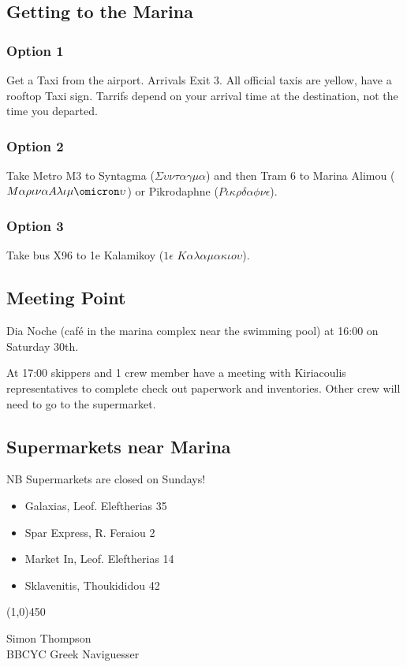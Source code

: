 \documentclass[12pt,a4paper,oneside]{article}
\begin{document}
\begin{multicols}{2}
\subsection*{Getting to the Marina}
\subsubsection*{Option 1}
Get a Taxi from the airport.  Arrivals Exit 3.  All official taxis are yellow, have a rooftop Taxi sign.  Tarrifs depend on your arrival time at the destination, not the time you departed.
\subsubsection*{Option 2}
Take Metro M3 to Syntagma ($\Sigma\upsilon\nu\tau\alpha\gamma\mu\alpha$) and then Tram 6 to Marina Alimou ($M\alpha\rho\iota\nu\alpha A\lambda\iota\mu\omicron\upsilon $) or Pikrodaphne ($P\iota\kappa\rho\delta\alpha\phi\nu\epsilon $).
\subsubsection*{Option 3}
Take bus X96 to 1e Kalamikoy ($1\epsilon$ $K\alpha\lambda\alpha\mu\alpha\kappa\iota o \upsilon$).

\subsection*{Meeting Point}

\noindent Dia Noche (café in the marina complex near the swimming pool) at 16:00 on Saturday 30th.

\noindent At 17:00 skippers and 1 crew member have a meeting with Kiriacoulis representatives to complete check out paperwork and inventories.  Other crew will need to go to the supermarket.

\subsection*{Supermarkets near Marina}
NB Supermarkets are closed on Sundays!
\begin{itemize}
\item Galaxias, Leof. Eleftherias 35
\item Spar Express, R. Feraiou 2
\item Market In, Leof. Eleftherias 14
\item Sklavenitis, Thoukididou 42
\end{itemize}

\end{multicols}

\begin{center}
\line(1,0){450}
\end{center}

\noindent Simon Thompson\\
BBCYC Greek Naviguesser
\end{document}
